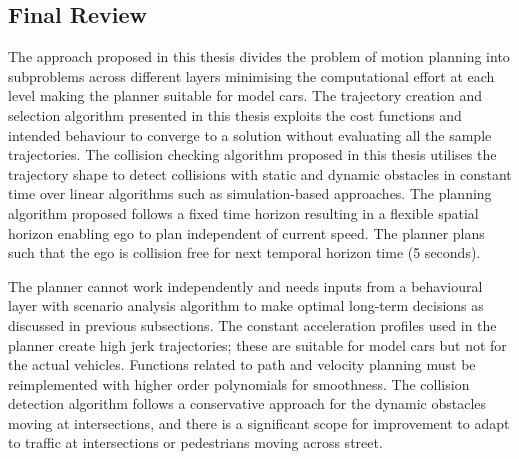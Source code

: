 \subsection{Final Review}
The approach proposed in this thesis divides the problem of motion planning into subproblems across different layers minimising the computational effort at each level making the planner suitable for model cars. The trajectory creation and selection algorithm presented in this thesis exploits the cost functions and intended behaviour to converge to a solution without evaluating all the sample trajectories. The collision checking algorithm proposed in this thesis utilises the trajectory shape to detect collisions with static and dynamic obstacles in constant time over linear algorithms such as simulation-based approaches. The planning algorithm proposed follows a fixed time horizon resulting in a flexible spatial horizon enabling ego to plan independent of current speed. The planner plans such that the ego is collision free for next temporal horizon time (5 seconds). 

The planner cannot work independently and needs inputs from a behavioural layer with scenario analysis algorithm to make optimal long-term decisions as discussed in previous subsections. The constant acceleration profiles used in the planner create high jerk trajectories; these are suitable for model cars but not for the actual vehicles. Functions related to path and velocity planning must be reimplemented with higher order polynomials for smoothness. The collision detection algorithm follows a conservative approach for the dynamic obstacles moving at intersections, and there is a significant scope for improvement to adapt to traffic at intersections or pedestrians moving across street. 



